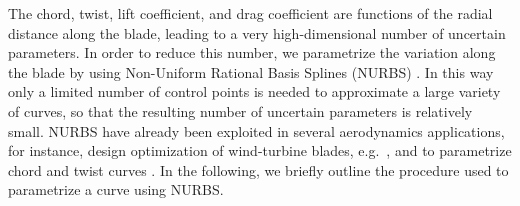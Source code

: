 The chord, twist, lift coefficient, and drag coefficient are functions of the radial distance along the blade, leading to a very high-dimensional number of uncertain parameters. In order to reduce this number, we parametrize the variation along the blade by using Non-Uniform Rational Basis Splines (NURBS) \cite{rogers2000}. In this way only a limited number of control points is needed to approximate a large variety of curves, so that the resulting number of uncertain parameters is relatively small. 
NURBS have already been exploited in several aerodynamics applications, for instance, design optimization of wind-turbine blades, e.g.~\cite{Bottasso2014,Ribeiro2012}, and to parametrize chord and twist curves \cite{Echeverria2017}. In the following, we briefly outline the procedure used to parametrize a curve using NURBS.


